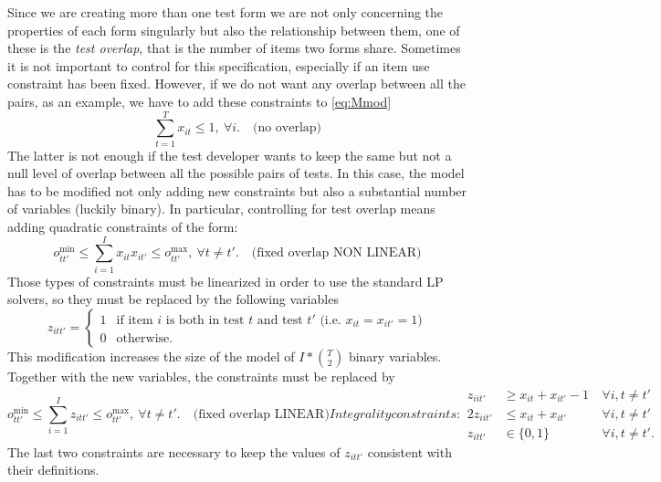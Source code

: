Since we are creating more than one test form we are not only concerning the properties of each form singularly but also the relationship between them, one of these is the \emph{test overlap}, that is the number of items two forms share. Sometimes it is not important to control for this specification, especially if an item use constraint has been fixed. However, if we do not want any overlap between all the pairs, as an example, we have to add these constraints to \eqref{eq:Mmod}
\begin{subequations}[resume]
	\begin{equation}\label{eq:Mmod:noOL}
	\sum_{t=1}^T{x_{it}} \leq 1, \ \forall i. \quad \mbox{(no overlap)}
	\end{equation}
\end{subequations}
The latter is not enough if the test developer wants to keep the same but not a null level of overlap between all the possible pairs of tests.
In this case, the model has to be modified not only adding new constraints but also a substantial number of variables (luckily binary).
In particular, controlling for test overlap means adding quadratic constraints of the form:
\begin{subequations}[intermezzo]
	\begin{equation*}
	o^{\min}_{tt'} \le \sum_{i=1}^I{x_{it}x_{it'}} \le o^{\max}_{tt'}, \ \forall t \neq t'. \quad \mbox{(fixed overlap NON LINEAR)}
	\end{equation*}
\end{subequations}
Those types of constraints must be linearized in order to use the standard LP solvers, so they must be replaced by the following variables
\begin{equation*}\label{eq:Mmod:Mol}
z_{itt'}=
\begin{cases}
1 & \mbox{if item }i \mbox{ is both in test }t \mbox{ and test } t' \mbox{ (i.e. }x_{it}=x_{it'}=1 \mbox{)} \\

0 & \mbox{otherwise}.
\end{cases}
\end{equation*}
This modification increases the size of the model of $I*{{T}\choose{2}}$ binary variables.
Together with the new variables, the constraints must be replaced by
\begin{subequations}[resume]
	\begin{equation}    \label{eq:Mmod:MOL}
	o^{\min}_{tt'} \le \sum_{i=1}^I{z_{itt'}} \le o^{\max}_{tt'}, \ \forall t \neq t'. \quad \mbox{(fixed overlap LINEAR)}
	\end{equation}
	Integrality constraints:
	\begin{alignat}{2}
	\label{eq:Mmod:Mic1}
	z_{iit'} & \ge x_{it}+x_{it'}-1 \ & \forall i,t \neq t'\\
	\label{eq:Mmod:Mic2}
	2 z_{iit'} & \le x_{it}+x_{it'} \ & \forall i,t \neq t'\\
	\nonumber
	z_{itt'} & \in \{0,1\} \ & \forall i,t \neq t'.  
	\end{alignat}
\end{subequations}
The last two constraints are necessary to keep the values of $z_{itt'}$ consistent with their definitions.

